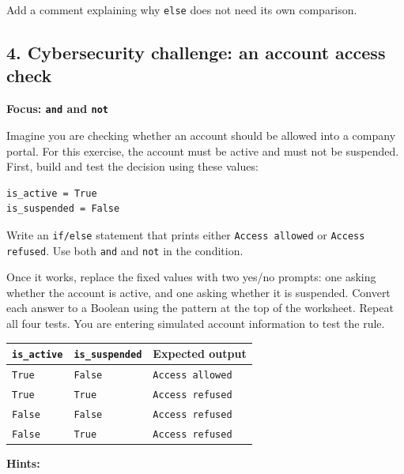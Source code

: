 \documentclass[12pt,a4paper]{article}
\begin{document}
Add a comment explaining why \texttt{else} does not need its own comparison.

\subsection*{4. Cybersecurity challenge: an account access check}
\textbf{Focus: \texttt{and} and \texttt{not}}

Imagine you are checking whether an account should be allowed into a company portal. For this exercise, the account must be active and must not be suspended. First, build and test the decision using these values:

\begin{minipage}{\linewidth}
\begin{lstlisting}
is_active = True
is_suspended = False
\end{lstlisting}
\end{minipage}
\par
Write an \texttt{if/else} statement that prints either \texttt{Access allowed} or \texttt{Access refused}. Use both \texttt{and} and \texttt{not} in the condition.

Once it works, replace the fixed values with two yes/no prompts: one asking whether the account is active, and one asking whether it is suspended. Convert each answer to a Boolean using the pattern at the top of the worksheet. Repeat all four tests. You are entering simulated account information to test the rule.

\begingroup\small\renewcommand{\arraystretch}{1.3}\begin{longtable}{>{\raggedright\arraybackslash}p{}>{\raggedright\arraybackslash}p{}>{\raggedright\arraybackslash}p{}}
\toprule
\rowcolor{panel} \texttt{is\_active} & \texttt{is\_suspended} & Expected output \\ \midrule\endhead
\texttt{True} & \texttt{False} & \texttt{Access allowed} \\
\texttt{True} & \texttt{True} & \texttt{Access refused} \\
\texttt{False} & \texttt{False} & \texttt{Access refused} \\
\texttt{False} & \texttt{True} & \texttt{Access refused} \\
\bottomrule\end{longtable}\endgroup
\textbf{Hints:}
\end{document}
